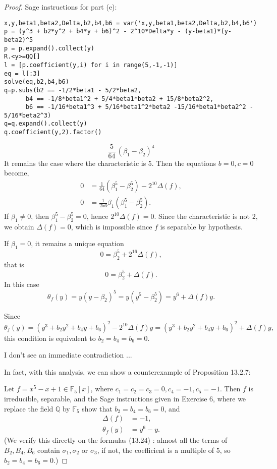 \documentclass[11pt,a4paper]{article}
\newcommand{\Q}{\mathbb{Q}}
\newcommand{\F}{\mathbb{F}}
\begin{document}
\begin{proof}
 Sage instructions for part (e):
\begin{verbatim}
x,y,beta1,beta2,Delta,b2,b4,b6 = var('x,y,beta1,beta2,Delta,b2,b4,b6')
p = (y^3 + b2*y^2 + b4*y + b6)^2 - 2^10*Delta*y - (y-beta1)*(y-beta2)^5
p = p.expand().collect(y)
R.<y>=QQ[]
l = [p.coefficient(y,i) for i in range(5,-1,-1)]
eq = l[:3]
solve(eq,b2,b4,b6)
q=p.subs(b2 == -1/2*beta1 - 5/2*beta2, 
      b4 == -1/8*beta1^2 + 5/4*beta1*beta2 + 15/8*beta2^2, 
      b6 == -1/16*beta1^3 + 5/16*beta1^2*beta2 -15/16*beta1*beta2^2 - 5/16*beta2^3)
q=q.expand().collect(y)
q.coefficient(y,2).factor()
 \end{verbatim}
 $$\frac{5}{64} \, {\left(\beta_{1} - \beta_{2}\right)}^{4}$$
 It remains the case where the characteristic is 5. Then the equations $b=0, c = 0$ become, 
 \begin{align*}
 0 &= \frac{1}{64}(\beta_1^5 - \beta_2^5) - 2^{10}\Delta(f),\\
 0 &= \frac {1}{256}\beta_1(\beta_1^5 - \beta_2^5).
 \end{align*}
If $\beta_1 \ne 0$, then $\beta_1^5 - \beta_2^5 = 0$, hence $2^{10} \Delta(f) = 0$. Since the characteristic is not 2, we obtain $\Delta(f) = 0$, which is impossible since $f$ is separable by hypothesis.

If $\beta_1 = 0$, it remains a unique equation
$$0 = \beta_2^5 + 2^{16} \Delta(f),$$
 that is
$$0 = \beta_2^5 + \Delta(f).$$
In this case
$$\theta_f(y) = y(y-\beta_2)^5 = y(y^5 - \beta_2^5) = y^6 + \Delta(f) y.$$

Since $$\theta_f(y) = (y^3 + b_2y^2+b_4y+b_6)^2 - 2^{10} \Delta(f) y = (y^3 + b_2y^2+b_4y+b_6)^2 + \Delta(f) y,$$ this condition is equivalent to $b_2 = b_4 = b_6 = 0$.

I don't see an immediate contradiction ...

In fact, with this analysis, we can show a counterexample of Proposition 13.2.7:

Let $f = x^5 - x + 1 \in \F_5[x]$, where $c_1 = c_2 = c_3 = 0, c_4 = -1,c_5 = -1$. Then $f$ is irreducible, separable, and the Sage instructions given in Exercise 6, where we replace the field $\Q$ by $\F_5$ show that $b_2 = b_4 = b_6 = 0$, and
\begin{align*}
\Delta(f) &= -1,\\
\theta_f(y) &= y^6 - y.
\end{align*}
(We verify this directly on the formulas (13.24) : almost all the terms of $B_2,B_4,B_6$ contain $\sigma_1,\sigma_2$ or $\sigma_3$, if not,  the coefficient is a multiple of 5, so $b_2 = b_4 = b_6 = 0$.)



\end{proof}
\end{document}
